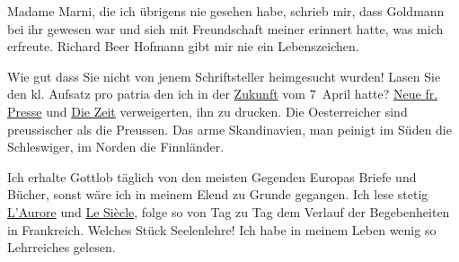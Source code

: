 \pstart
           Madame Marni, die ich übrigens nie gesehen
               habe, schrieb mir, dass Goldmann bei ihr
               gewesen war und sich mit Freundschaft meiner erinnert hatte, was mich erfreute. Richard Beer Hofmann gibt mir nie {\pb}ein Lebenszeichen.\pend
           
\pstart
           Wie gut dass Sie nicht von jenem Schriftsteller heimgesucht wurden! Lasen Sie den kl.
                  Aufsatz pro patria den ich
               in der \uline{Zukunft} vom 7 April hatte? \uline{Neue fr. Presse} und \uline{Die Zeit} verweigerten, ihn zu drucken. Die Oesterreicher sind preussischer als die
                  Preussen. Das arme Skandinavien, man peinigt im Süden die Schleswiger, im Norden die Finnländer.\pend
           
\pstart
           Ich erhalte Gottlob täglich von den meisten Gegenden Europas Briefe und Bücher, sonst wäre ich in meinem Elend zu Grunde
               gegangen. Ich lese stetig \uline{L’Aurore} und \uline{Le Siècle}, folge so von Tag zu Tag dem Verlauf der Begebenheiten in Frankreich. Welches Stück Seelenlehre! Ich habe in meinem {\pb}Leben wenig so Lehrreiches
               gelesen.\pend
           
